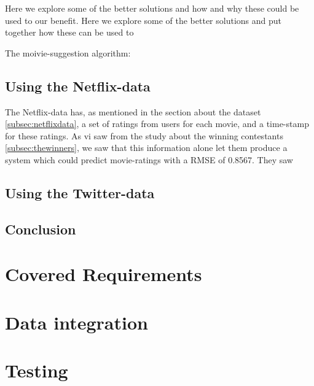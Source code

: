 Here we explore some of the better solutions and how and why these could be used to our benefit.
Here we explore some of the better solutions and put together how these can be used to


The moivie-suggestion algorithm:


\subsection{Using the Netflix-data}
The Netflix-data has, as mentioned in the section about the dataset \ref{subsec:netflixdata}, a set of ratings from users for each movie, and a time-stamp for these ratings. As vi saw from the study about the winning contestants \ref{subsec:thewinners}, we saw that this information alone let them produce a system which could predict movie-ratings with a RMSE of 0.8567. They saw

\subsection{Using the Twitter-data}

\subsection{Conclusion}


\section{Covered Requirements}

\section{Data integration}

\section{Testing}
